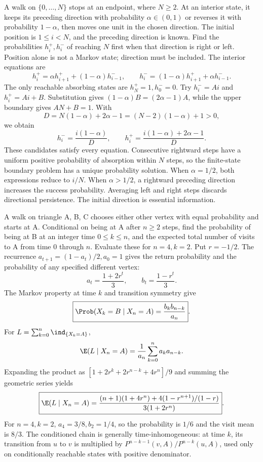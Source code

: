 A walk on $\{0,\ldots,N\}$ stops at an endpoint, where $N\ge2$. At an interior state, it keeps its preceding direction with probability $\alpha\in(0,1)$ or reverses it with probability $1-\alpha$, then moves one unit in the chosen direction. The initial position is $1\le i<N$, and the preceding direction is known. Find the probabilities $h_i^+,h_i^-$ of reaching $N$ first when that direction is right or left.
\solution Position alone is not a Markov state; direction must be included. The interior equations are
\[
 h_i^+=\alpha h_{i+1}^++(1-\alpha)h_{i-1}^-,\qquad
 h_i^-=(1-\alpha)h_{i+1}^++\alpha h_{i-1}^-.
\]
The only reachable absorbing states are $h_N^+=1,h_0^-=0$. Try $h_i^-=Ai$ and $h_i^+=Ai+B$. Substitution gives $(1-\alpha)B=(2\alpha-1)A$, while the upper boundary gives $AN+B=1$. With
\[
 D=N(1-\alpha)+2\alpha-1=(N-2)(1-\alpha)+1>0,
\]
we obtain
\[
 \boxed{h_i^- =\frac{i(1-\alpha)}D,\qquad
 h_i^+=\frac{i(1-\alpha)+2\alpha-1}D}.
\]
These candidates satisfy every equation. Consecutive rightward steps have a uniform positive probability of absorption within $N$ steps, so the finite-state boundary problem has a unique probability solution. When $\alpha=1/2$, both expressions reduce to $i/N$. When $\alpha>1/2$, a rightward preceding direction increases the success probability.
\insight Averaging left and right steps discards directional persistence. The initial direction is essential information.

A walk on triangle A, B, C chooses either other vertex with equal probability and starts at A. Conditional on being at A after $n\ge2$ steps, find the probability of being at B at an integer time $0\le k\le n$, and the expected total number of visits to A from time 0 through $n$. Evaluate these for $n=4,k=2$.
\solution Put $r=-1/2$. The recurrence $a_{t+1}=(1-a_t)/2,a_0=1$ gives the return probability and the probability of any specified different vertex:
\[
 a_t=\frac{1+2r^t}{3},\qquad b_t=\frac{1-r^t}{3}.
\]
The Markov property at time $k$ and transition symmetry give
\[
 \boxed{\Prob(X_k=B\mid X_n=A)=\frac{b_kb_{n-k}}{a_n}}.
\]
For $L=\sum_{k=0}^n\ind_{\{X_k=A\}}$,
\[
 \E(L\mid X_n=A)=\frac1{a_n}\sum_{k=0}^n a_ka_{n-k}.
\]
Expanding the product as $[1+2r^k+2r^{n-k}+4r^n]/9$ and summing the geometric series yields
\[
 \boxed{\E(L\mid X_n=A)=
 \frac{(n+1)(1+4r^n)+4(1-r^{n+1})/(1-r)}{3(1+2r^n)}}.
\]
For $n=4,k=2$, $a_4=3/8,b_2=1/4$, so the probability is $\boxed{1/6}$ and the visit mean is $\boxed{8/3}$. The conditioned chain is generally time-inhomogeneous: at time $k$, its transition from $u$ to $v$ is multiplied by $P^{n-k-1}(v,A)/P^{n-k}(u,A)$, used only on conditionally reachable states with positive denominator.

